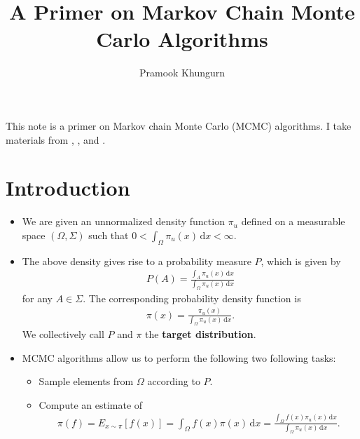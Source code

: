 \documentclass[10pt]{article}
\title{A Primer on Markov Chain Monte Carlo Algorithms}
\author{Pramook Khungurn}
\newcommand{\dee}{\mathrm{d}}
\begin{document}
\maketitle

This note is a primer on Markov chain Monte Carlo (MCMC) algorithms. I take materials from \cite{Andrieu:2003}, \cite{Gareth:2004}, and \cite{Neal:2011}.

\section{Introduction}

\begin{itemize}
  \item We are given an unnormalized density function $\pi_u$ defined on a measurable space $(\Omega,\Sigma)$ such that $0 < \int_\Omega \pi_u(x)\, \dee x < \infty$.
  
  \item The above density gives rise to a probability measure $P$, which is given by
  \begin{align*}
    P(A) = \frac{\int_A \pi_u( x)\, \dee x}{\int_\Omega \pi_u( x)\, \dee x}
  \end{align*}
  for any $A \in \Sigma$. The corresponding probability density function is
  \begin{align*}
    \pi( x) = \frac{\pi_u( x)}{\int_\Omega \pi_u( x)\, \dee x}.
  \end{align*}
  We collectively call $P$ and $\pi$ the {\bf target distribution}.

  \item MCMC algorithms allow us to perform the following two following tasks:
  \begin{itemize}
    \item Sample elements from $\Omega$ according to $P$.
    \item Compute an estimate of 
    \begin{align*}
    \pi(f) 
    = E_{ x \sim \pi}[f( x)]
    = \int_\Omega f( x) \pi( x)\, \dee  x
    = \frac{\int_\Omega f( x) \pi_u( x)\, \dee  x}{\int_\Omega \pi_u( x)\, \dee x}.
    \end{align*}
  \end{itemize}


\end{itemize}
\end{document}
